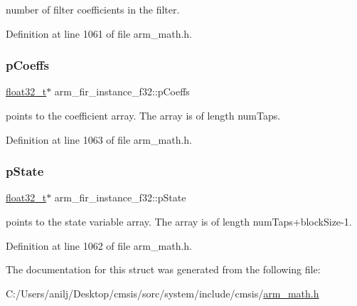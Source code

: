 number of filter coefficients in the filter. 

Definition at line 1061 of file arm\+\_\+math.\+h.

\mbox{\label{structarm__fir__instance__f32_a1c9cfca901d5902afeb640f2831488f4}} 
\subsubsection{\texorpdfstring{p\+Coeffs}{pCoeffs}}
{\footnotesize\ttfamily \hyperlink{arm__math_8h_a4611b605e45ab401f02cab15c5e38715}{float32\+\_\+t}$\ast$ arm\+\_\+fir\+\_\+instance\+\_\+f32\+::p\+Coeffs}

points to the coefficient array. The array is of length num\+Taps. 

Definition at line 1063 of file arm\+\_\+math.\+h.

\mbox{\label{structarm__fir__instance__f32_a7afcf4022e8560db9b8fd28b0d090a15}} 
\subsubsection{\texorpdfstring{p\+State}{pState}}
{\footnotesize\ttfamily \hyperlink{arm__math_8h_a4611b605e45ab401f02cab15c5e38715}{float32\+\_\+t}$\ast$ arm\+\_\+fir\+\_\+instance\+\_\+f32\+::p\+State}

points to the state variable array. The array is of length num\+Taps+block\+Size-\/1. 

Definition at line 1062 of file arm\+\_\+math.\+h.



The documentation for this struct was generated from the following file\+:\begin{DoxyCompactItemize}
\item 
C\+:/\+Users/anilj/\+Desktop/cmsis/sorc/system/include/cmsis/\hyperlink{arm__math_8h}{arm\+\_\+math.\+h}\end{DoxyCompactItemize}
